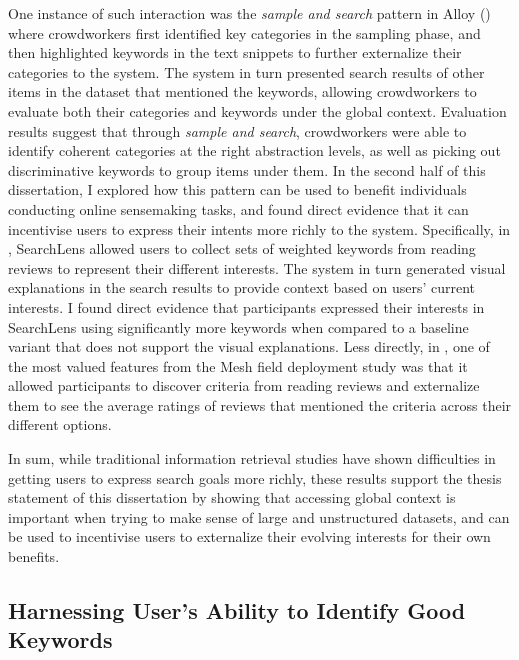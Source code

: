 One instance of such interaction was the \emph{sample and search} pattern in Alloy () where  crowdworkers first identified key categories in the sampling phase, and then highlighted keywords in the text snippets to further externalize their categories to the system. The system in turn presented search results of other items in the dataset that mentioned the keywords,  allowing crowdworkers to evaluate both their categories and keywords under the global context. Evaluation results suggest that through \emph{sample and search}, crowdworkers were able to identify coherent categories at the right abstraction levels, as well as picking out discriminative keywords to group items under them. In the second half of this dissertation, I explored how this pattern can be used to benefit individuals conducting online sensemaking tasks, and found direct evidence that it can incentivise users to express their intents more richly to the system. Specifically, in , SearchLens allowed users to collect sets of weighted keywords from reading reviews to represent their different interests. The system in turn generated visual explanations in the search results to provide context based on users’ current interests. I found direct evidence that participants expressed their interests in SearchLens using significantly more keywords when compared to a baseline variant that does not support the visual explanations. Less directly, in , one of the most valued features from the Mesh field deployment study was that it allowed participants to discover criteria from reading reviews and externalize them to see the average ratings of reviews that mentioned the criteria across their different options.

In sum, while traditional information retrieval studies have shown difficulties in getting users to express search goals more richly, these results support the thesis statement of this dissertation by showing that accessing global context is important when trying to make sense of large and unstructured datasets, and can be used to incentivise users to externalize their evolving interests for their own benefits. 

\subsection{Harnessing User’s Ability to Identify Good Keywords}

